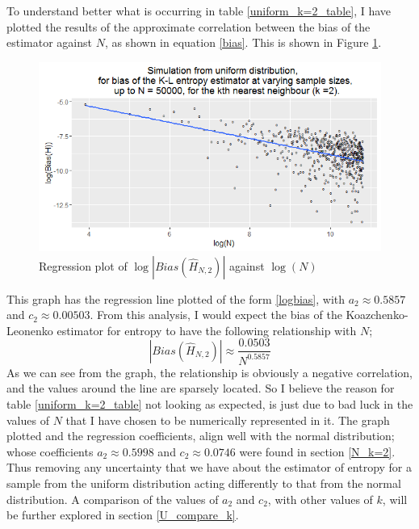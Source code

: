 \documentclass{article}
\begin{document}
To understand better what is occurring in table \ref{uniform_k=2_table}, I have plotted the results of the approximate correlation between the bias of the estimator against $N$, as shown in equation \ref{bias}. This is shown in Figure \ref{uniform_k=2_graph}.

\begin{figure}
  \begin{center}
    \includegraphics[width=\textwidth]{./Graphs/Uniform_k=2_plot.png}
  \end{center}
\caption{Regression plot of $\log|Bias(\hat{H}_{N, 2})|$ against $\log(N)$}
  \label{uniform_k=2_graph}
\end{figure}

This graph has the regression line plotted of the form \ref{logbias}, with $a_{2} \approx 0.5857$ and $c_{2} \approx 0.00503$. From this analysis, I would expect the bias of the Koazchenko-Leonenko estimator for entropy to have the following relationship with $N$;
\begin{equation}
|Bias(\hat{H}_{N, 2})| \approx \frac{0.0503}{N^{0.5857}}\nonumber
\end{equation}
As we can see from the graph, the relationship is obviously a negative correlation, and the values around the line are sparsely located. So I believe the reason for table \ref{uniform_k=2_table} not looking as expected, is just due to bad luck in the values of $N$ that I have chosen to be numerically represented in it. The graph plotted and the regression coefficients, align well with the normal distribution; whose coefficients $a_{2} \approx 0.5998$ and $c_{2} \approx 0.0746$ were found in section \ref{N_k=2}. Thus removing any uncertainty that we have about the estimator of entropy for a sample from the uniform distribution acting differently to that from the normal distribution. A comparison of the values of $a_{2}$ and $c_{2}$, with other values of $k$, will be further explored in section \ref{U_compare_k}.
\end{document}
